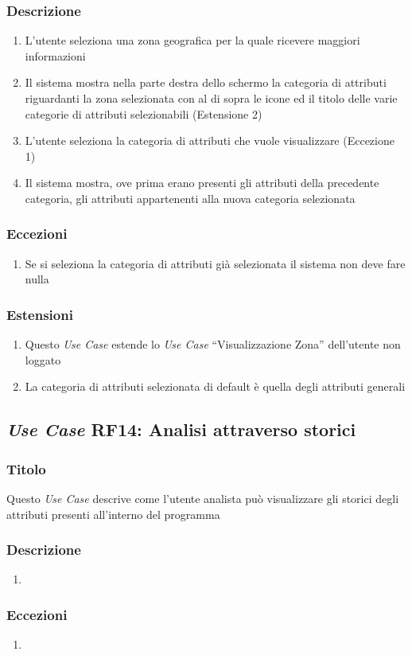         \subsubsection{Descrizione}
            \begin{enumerate}
                \item L'utente seleziona una zona geografica per la quale ricevere maggiori informazioni
                \item Il sistema mostra nella parte destra dello schermo la categoria di attributi riguardanti la zona selezionata con al di sopra le icone ed il titolo delle varie categorie di attributi selezionabili (Estensione 2)
                \item L'utente seleziona la categoria di attributi che vuole visualizzare (Eccezione 1)
                \item Il sistema mostra, ove prima erano presenti gli attributi della precedente categoria, gli attributi appartenenti alla nuova categoria selezionata
            \end{enumerate}
        \subsubsection{Eccezioni}
            \begin{enumerate}
                \item Se si seleziona la categoria di attributi già selezionata il sistema non deve fare nulla
            \end{enumerate}
        \subsubsection{Estensioni}
            \begin{enumerate}
                \item Questo \textit{Use Case} estende lo \textit{Use Case} ``Visualizzazione Zona'' dell'utente non loggato
                \item La categoria di attributi selezionata di default è quella degli attributi generali
            \end{enumerate}

    \subsection{\textit{Use Case} RF14: Analisi attraverso storici}
        \subsubsection{Titolo}
            Questo \textit{Use Case} descrive come l'utente analista può visualizzare gli storici degli attributi presenti all'interno del programma
        \subsubsection{Descrizione}
            \begin{enumerate}
                \item 
            \end{enumerate}
        \subsubsection{Eccezioni}
            \begin{enumerate}
                \item 
            \end{enumerate}